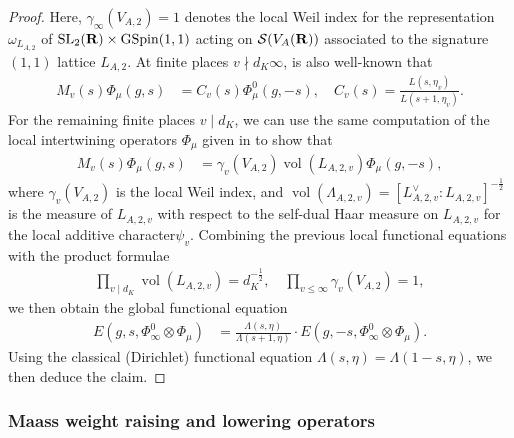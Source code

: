 \documentclass{amsart}
\theoremstyle{definition}
\begin{document}
\begin{proof}
Here, $\gamma_{\infty}(V_{A, 2}) = 1$ denotes the local Weil index for the representation $\omega_{L_{A,2}}$
of $\operatorname{SL}_2({\bf{R}}) \times \operatorname{GSpin}(1,1)$ acting on $\mathcal{S}(V_A({\bf{R}}))$
associated to the signature $(1,1)$ lattice $L_{A ,2}$. At finite places $v \nmid d_K \infty$, is also well-known that 
\begin{align*} M_{v}(s) \Phi_{\mu}(g, s) &= C_{v}(s) \Phi_{\mu}^0(g, -s), \quad C_{v}(s) = \frac{L(s, \eta_v)}{ L(s + 1, \eta_v) }.\end{align*} 
For the remaining finite places $v \mid d_K$, we can use the same computation of the local 
intertwining operators $\Phi_{\mu}$ given in \cite[Proposition 2.5]{BY} to show that 
\begin{align*} M_v(s) \Phi_{\mu}(g, s) &= \gamma_v(V_{A, 2}) \operatorname{vol}(L_{A, 2, v}) \Phi_{\mu}(g, -s), \end{align*} 
where $\gamma_v(V_{A, 2})$ is the local Weil index, 
and $\operatorname{vol}(\Lambda_{A, 2, v}) = [ L_{A, 2, v}^{\vee}: L_{A, 2, v} ]^{-\frac{1}{2}}$
is the measure of $L_{A, 2, v}$ with respect to the self-dual Haar measure on $L_{A, 2, v}$ for the local additive character$\psi_v$. 
Combining the previous local functional equations with the product formulae
\begin{align*} \prod_{v \mid d_K} \operatorname{vol}(L_{A, 2, v}) = d_K^{-\frac{1}{2}}, 
\quad \prod_{v \leq \infty} \gamma_{v}(V_{A, 2}) = 1,\end{align*}
we then obtain the global functional equation
\begin{align*} E(g, s, \Phi_{\infty}^0 \otimes \Phi_{\mu}) 
&= \frac{\Lambda(s, \eta)}{\Lambda(s+1, \eta)} \cdot E(g, -s, \Phi_{\infty}^0 \otimes \Phi_{\mu}). \end{align*}
Using the classical (Dirichlet) functional equation $\Lambda(s, \eta) = \Lambda(1-s, \eta)$, we then deduce the claim. \end{proof} 

\subsubsection{Maass weight raising and lowering operators}
\end{document}
